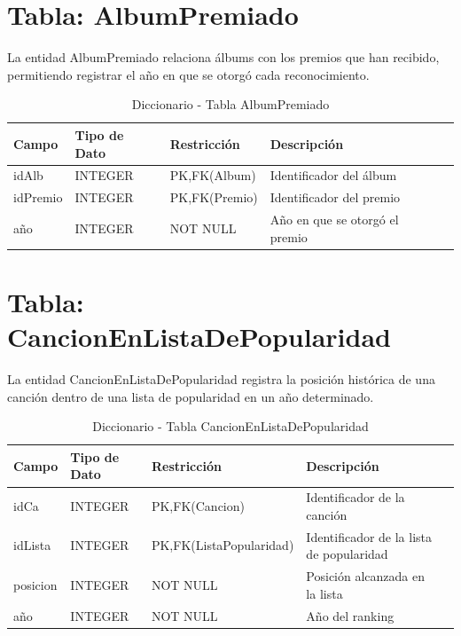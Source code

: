 \documentclass[12pt,a4paper,spanish,oneside]{report}
\begin{document}
\section{Tabla: AlbumPremiado}
La entidad AlbumPremiado relaciona álbums con los premios que han recibido,
permitiendo registrar el año en que se otorgó cada reconocimiento.
\begin{table}[H]
\centering
\caption{Diccionario - Tabla AlbumPremiado}
\begin{tabular}{|l|l|l|l|l|}
\hline
\textbf{Campo} & \textbf{Tipo de Dato} & \textbf{Restricción} & \textbf{Descripción} \\
\hline
idAlb & INTEGER & PK,FK(Album) & Identificador del álbum \\
\hline
idPremio & INTEGER & PK,FK(Premio) & Identificador del premio \\
\hline
año & INTEGER & NOT NULL & Año en que se otorgó el premio \\
\hline
\end{tabular}
\end{table}

\section{Tabla: CancionEnListaDePopularidad}
La entidad CancionEnListaDePopularidad registra la posición histórica de una
canción dentro de una lista de popularidad en un año determinado.
\begin{table}[H]
\centering
\caption{Diccionario - Tabla CancionEnListaDePopularidad}
\begin{tabular}{|l|l|l|l|l|}
\hline
\textbf{Campo} & \textbf{Tipo de Dato} & \textbf{Restricción} & \textbf{Descripción} \\
\hline
idCa & INTEGER & PK,FK(Cancion) & Identificador de la canción \\
\hline
idLista & INTEGER & PK,FK(ListaPopularidad) & Identificador de la lista de popularidad \\
\hline
posicion & INTEGER & NOT NULL & Posición alcanzada en la lista \\
año & INTEGER & NOT NULL & Año del ranking \\
\hline
\end{tabular}
\end{table}
\end{document}
